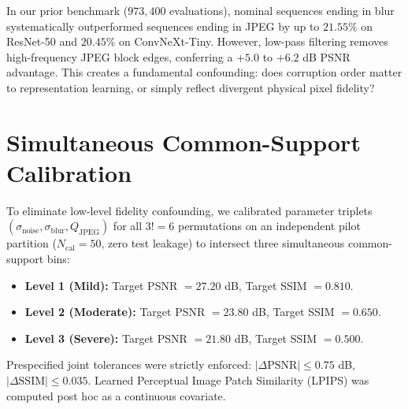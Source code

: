 \documentclass[10pt,journal,compsoc]{IEEEtran}
\begin{document}
In our prior benchmark ($973{,}400$ evaluations), nominal sequences ending in blur systematically outperformed sequences ending in JPEG by up to $21.55\%$ on ResNet-50 and $20.45\%$ on ConvNeXt-Tiny. However, low-pass filtering removes high-frequency JPEG block edges, conferring a $+5.0$ to $+6.2$ dB PSNR advantage. This creates a fundamental confounding: does corruption order matter to representation learning, or simply reflect divergent physical pixel fidelity?

\section{Simultaneous Common-Support Calibration}
To eliminate low-level fidelity confounding, we calibrated parameter triplets $( \sigma_{\text{noise}}, \sigma_{\text{blur}}, Q_{\text{JPEG}} )$ for all $3! = 6$ permutations on an independent pilot partition ($N_{\text{cal}} = 50$, zero test leakage) to intersect three simultaneous common-support bins:
\begin{itemize}
    \item \textbf{Level 1 (Mild):} Target PSNR $= 27.20$ dB, Target SSIM $= 0.810$.
    \item \textbf{Level 2 (Moderate):} Target PSNR $= 23.80$ dB, Target SSIM $= 0.650$.
    \item \textbf{Level 3 (Severe):} Target PSNR $= 21.80$ dB, Target SSIM $= 0.500$.
\end{itemize}
Prespecified joint tolerances were strictly enforced: $|\Delta \text{PSNR}| \le 0.75$ dB, $|\Delta \text{SSIM}| \le 0.035$. Learned Perceptual Image Patch Similarity (LPIPS) was computed post hoc as a continuous covariate.
\end{document}
